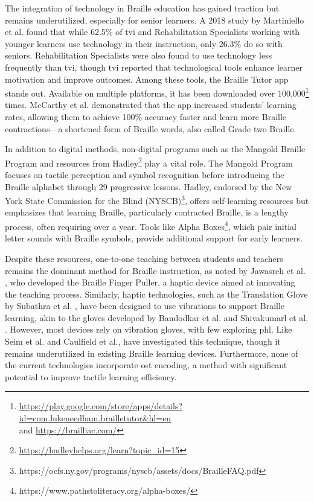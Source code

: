 The integration of technology in Braille education has gained traction but remains underutilized, especially for senior learners. A 2018 study by Martiniello et al. \cite{Martiniello2018} found that while 62.5\% of \gls{tvi} and Rehabilitation Specialists working with younger learners use technology in their instruction, only 26.3\% do so with seniors. Rehabilitation Specialists were also found to use technology less frequently than \gls{tvi}, though \gls{tvi} reported that technological tools enhance learner motivation and improve outcomes. Among these tools, the Braille Tutor app stands out. Available on multiple platforms, it has been downloaded over 100,000\footnote{\url{https://play.google.com/store/apps/details?id=com.lukeneedham.brailletutor&hl=en}\\and \url{https://brailliac.com/}} times. McCarthy et al. \cite{McCarthy2016} demonstrated that the app increased students’ learning rates, allowing them to achieve 100\% accuracy faster and learn more Braille contractions—a shortened form of Braille words, also called Grade two Braille\cite{troughton1992guidelines}.

In addition to digital methods, non-digital programs such as the Mangold Braille Program \cite{Mangoldnd} and resources from Hadley\footnote{\url{https://hadleyhelps.org/learn?topic_id=15}} play a vital role.
The Mangold Program focuses on tactile perception and symbol recognition before introducing the Braille alphabet through 29 progressive lessons. Hadley, endorsed by the New York State Commission for the Blind (NYSCB)\footnote{https://ocfs.ny.gov/programs/nyscb/assets/docs/BrailleFAQ.pdf}, offers self-learning resources but emphasizes that learning Braille, particularly contracted Braille, is a lengthy process, often requiring over a year. Tools like Alpha Boxes\footnote{https://www.pathstoliteracy.org/alpha-boxes/}, which pair initial letter sounds with Braille symbols, provide additional support for early learners.

Despite these resources, one-to-one teaching between students and teachers remains the dominant method for Braille instruction, as noted by Jawasreh et al. \cite{Jawasreh2020}, who developed the Braille Finger Puller, a haptic device aimed at innovating the teaching process. Similarly, haptic technologies, such as the Translation Glove by Subathra et al. \cite{Subathra2024}, have been designed to use vibrations to support Braille learning, akin to the gloves developed by Bandodkar et al. \cite{Bandodkar2014} and Shivakumarl et al. \cite{Shivakumarl2013}. However, most devices rely on vibration gloves, with few exploring \gls{phl}. Like Seim et al. and Caulfield et al., \cite{Learning2024} have investigated this technique, though it remains underutilized in existing Braille learning devices. Furthermore, none of the current technologies incorporate \gls{ost} encoding, a method with significant potential to improve tactile learning efficiency.

